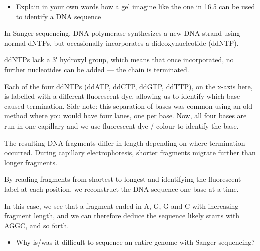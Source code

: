 \documentclass[
  letterpaper,
  DIV=11,
  numbers=noendperiod]{scrreprt}
\providecommand{\tightlist}{%
  \setlength{\itemsep}{0pt}\setlength{\parskip}{0pt}}\usepackage{longtable,booktabs,array}
\begin{document}
\begin{itemize}
\tightlist
\item
  Explain in your own words how a gel imagine like the one in 16.5 can
  be used to identify a DNA sequence
\end{itemize}

\begin{tcolorbox}[enhanced jigsaw, arc=.35mm, left=2mm, titlerule=0mm, rightrule=.15mm, colframe=quarto-callout-tip-color-frame, coltitle=black, colback=white, opacityback=0, bottomtitle=1mm, bottomrule=.15mm, colbacktitle=quarto-callout-tip-color!10!white, breakable, title=\textcolor{quarto-callout-tip-color}{\faLightbulb}\hspace{0.5em}{Answer}, toptitle=1mm, toprule=.15mm, opacitybacktitle=0.6, leftrule=.75mm]

In Sanger sequencing, DNA polymerase synthesizes a new DNA strand using
normal dNTPs, but occasionally incorporates a dideoxynucleotide (ddNTP).

ddNTPs lack a 3′ hydroxyl group, which means that once incorporated, no
further nucleotides can be added --- the chain is terminated.

Each of the four ddNTPs (ddATP, ddCTP, ddGTP, ddTTP), on the x-axis
here, is labelled with a different fluorescent dye, allowing us to
identify which base caused termination. Side note: this separation of
bases was common using an old method where you would have four lanes,
one per base. Now, all four bases are run in one capillary and we use
fluorescent dye / colour to identify the base.

The resulting DNA fragments differ in length depending on where
termination occurred. During capillary electrophoresis, shorter
fragments migrate further than longer fragments.

By reading fragments from shortest to longest and identifying the
fluorescent label at each position, we reconstruct the DNA sequence one
base at a time.

In this case, we see that a fragment ended in A, G, G and C with
increasing fragment length, and we can therefore deduce the sequence
likely starts with AGGC, and so forth.

\end{tcolorbox}

\begin{itemize}
\tightlist
\item
  Why is/was it difficult to sequence an entire genome with Sanger
  sequencing?
\end{itemize}
\end{document}
